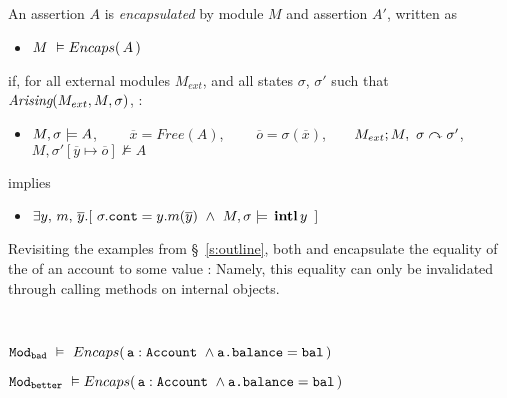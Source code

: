 \begin{definition}
\label{def:encapsulation}
An assertion $A$ is \emph{encapsulated} by module $M$ and assertion $A'$, written as
\begin{itemize}
 \item     $M\ \vDash {\ensuremath Encaps(\, A\, )}$
 \end{itemize}
if, for all external modules $M_{ext}$, and all states $\sigma$, $\sigma'$
such that $\textit{Arising}(M_{ext}, M, \sigma)$, :

\begin{itemize}
 \item
  $M , \sigma \models A$,  \ \ \ \   $\overline{x}=Free(A)$, \  \  \ \ $\overline{o}=\sigma(\overline{x})$,\ \ \ \ $M_{ext} ; M,\ \sigma \curvearrowright \sigma'$, \ \ \ ${M},{\sigma'[\overline{y}\mapsto{\overline{o}}]}\not\vDash{A}$
 \end{itemize}

implies

 \begin{itemize}
 \item   $\exists y,\,m,\, \overline{y} .[\ \sigma.\prg{cont}= y.m(\overline{y})\ \wedge\  \satisfiesA{M}{\sigma}{\internal{y}} \ ]
$
 \end{itemize}
\end{definition}

Revisiting the examples from \S~\ref{s:outline}, %
both \ModB and \ModC encapsulate   the  equality of the  of an account to some value : 
Namely, this equality can only be invalidated through calling  methods on internal objects.
 
%
\\
\strut \hspace{1cm}
${\texttt{Mod}}_{{\texttt{bad}}}\ \vDash\ {Encaps(\,  {\texttt{a}}:{\texttt{Account}}\ \wedge {\texttt{a.balance}}={\texttt{bal}}\, )}$
\\
\strut \hspace{1cm}
${\texttt{Mod}}_{{\texttt{better}}}\ \vDash {\ensuremath Encaps(\,  {\texttt{a}}:{\texttt{Account}}\ \wedge {\texttt{a.balance}}={\texttt{bal}}\, )}$
\\
\strut \hspace{1cm} 
\\
\strut \hspace{1cm} 

